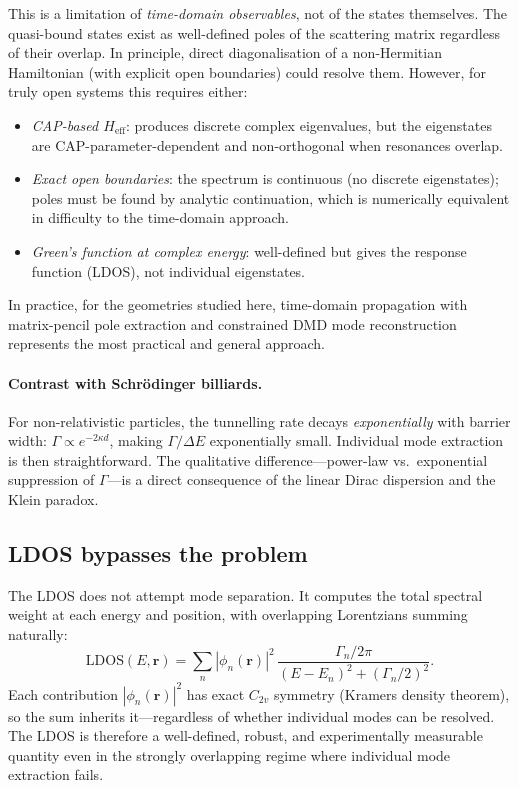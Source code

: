\documentclass[11pt,a4paper]{article}
\newcommand{\vb}[1]{\mathbf{#1}}
\begin{document}
This is a limitation of \emph{time-domain observables}, not of the
states themselves.  The quasi-bound states exist as well-defined poles
of the scattering matrix regardless of their overlap.  In principle,
direct diagonalisation of a non-Hermitian Hamiltonian (with explicit
open boundaries) could resolve them.  However, for truly open systems
this requires either:

\begin{itemize}
  \item \emph{CAP-based $H_\text{eff}$}: produces discrete complex
        eigenvalues, but the eigenstates are CAP-parameter-dependent
        and non-orthogonal when resonances overlap.
  \item \emph{Exact open boundaries}: the spectrum is continuous
        (no discrete eigenstates); poles must be found by analytic
        continuation, which is numerically equivalent in difficulty
        to the time-domain approach.
  \item \emph{Green's function at complex energy}: well-defined but
        gives the response function (LDOS), not individual eigenstates.
\end{itemize}

In practice, for the geometries studied here, time-domain propagation
with matrix-pencil pole extraction and constrained DMD mode
reconstruction represents the most practical and general approach.

\paragraph{Contrast with Schr\"odinger billiards.}
For non-relativistic particles, the tunnelling rate decays
\emph{exponentially} with barrier width:
$\Gamma \propto e^{-2\kappa d}$, making $\Gamma/\Delta E$
exponentially small.  Individual mode extraction is then
straightforward.  The qualitative difference---power-law vs.\
exponential suppression of $\Gamma$---is a direct consequence of
the linear Dirac dispersion and the Klein paradox.

\subsection{LDOS bypasses the problem}

The LDOS does not attempt mode separation.  It computes the total
spectral weight at each energy and position, with overlapping
Lorentzians summing naturally:
\begin{equation}
  \text{LDOS}(E, \vb{r}) =
  \sum_n |\phi_n(\vb{r})|^2\,
  \frac{\Gamma_n / 2\pi}{(E - E_n)^2 + (\Gamma_n/2)^2}.
\end{equation}
Each contribution $|\phi_n(\vb{r})|^2$ has exact $C_{2v}$ symmetry
(Kramers density theorem), so the sum inherits it---regardless of
whether individual modes can be resolved.  The LDOS is therefore
a well-defined, robust, and experimentally measurable quantity
even in the strongly overlapping regime where individual mode
extraction fails.
\end{document}
